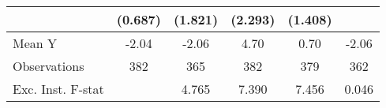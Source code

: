 {\begin{tabular}{l*{5}{c}}
            &     (0.687)         &     (1.821)         &     (2.293)         &     (1.408)         &                     \\
\midrule
Mean Y      &       -2.04         &       -2.06         &        4.70         &        0.70         &       -2.06         \\
Observations&         382         &         365         &         382         &         379         &         362         \\
Exc. Inst. F-stat&                     &       4.765         &       7.390         &       7.456         &       0.046         \\
\bottomrule
\end{tabular}
}
